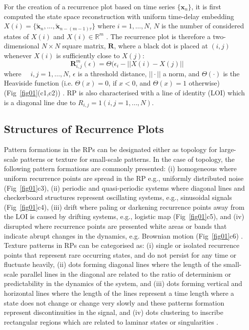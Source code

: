 \documentclass[fleqn,10pt]{wlscirep}
\begin{document}
For the creation of a recurrence plot based on time series $\{ \boldsymbol{x}_n \}$, it is first computed the state space reconstruction with uniform time-delay embedding $X(i)=\{ \boldsymbol{ \tilde{x} }_n, \dots, \boldsymbol{ \tilde{x} }_{n -(m-1)\tau} \}$ where $i=1,\dots,N$, $N$ is the number of considered states of $X(i)$ and $X(i) \in \mathbb{R}^m$ \cite{eckmann1987}.
The recurrence plot is therefore a two-dimensional $N \times N$ square matrix, $\mathbf{R}$, where a black dot is placed at $(i,j)$ whenever $X(i)$ is sufficiently close to $X(j)$:
\begin{equation}
\mathbf{R}^{m}_{i,j} (\epsilon) = \Theta ( \epsilon_i - || X(i) - X(j) ||
\end{equation}
where $\quad i,j=1,\dots,N$, $\epsilon$ is a threshold distance, $|| \cdotp ||$ a norm, and $\Theta(\cdotp)$ is the Heaviside function (i.e. $\Theta(x)=0$, if $x<0$, and $\Theta(x)=1$ otherwise) (Fig~\ref{fig01}(c1,c2)) \cite{eckmann1987, marwan2007,marwan2015}.
RP is also characterised with a line of identity (LOI) which is a diagonal line due to $ R_{i,j}=1 (i,j=1,\dots,N)$.

\subsection*{Structures of Recurrence Plots}
Pattern formations in the RPs can be designated either as topology for large-scale patterns or texture for small-scale patterns.
In the case of topology, the following pattern formations are commonly presented: (i) homogeneous where uniform recurrence points are spread in the RP e.g., uniformly distributed noise (Fig~\ref{fig01}c3), (ii) periodic and quasi-periodic systems where diagonal lines and checkerboard structures represent oscillating systems, e.g., sinusoidal signals (Fig~\ref{fig01}c4), (iii) drift where paling or darkening recurrence points away from the LOI is caused by drifting systems, e.g., logistic map (Fig~\ref{fig01}c5), and (iv) disrupted where recurrence points are presented white areas or bands that indicate abrupt changes in the dynamics, e.g. Brownian motion (Fig~\ref{fig01}c6) \cite{eckmann1987, marwan2015}.
Texture patterns in RPs can be categorised as: (i) single or isolated recurrence points that represent rare occurring states, and do not persist for any time or fluctuate heavily, (ii) dots forming diagonal lines where the length of the small-scale parallel lines in the diagonal are related to the ratio of determinism or predictability in the dynamics of the system, and (iii) dots forming vertical and horizontal lines where the length of the lines represent a time length where a state does not change or change very slowly and these patterns formation represent discontinuities in the signal, and (iv) dots clustering to inscribe rectangular regions which are related to laminar states or singularities \cite{marwan2015}.
\end{document}
